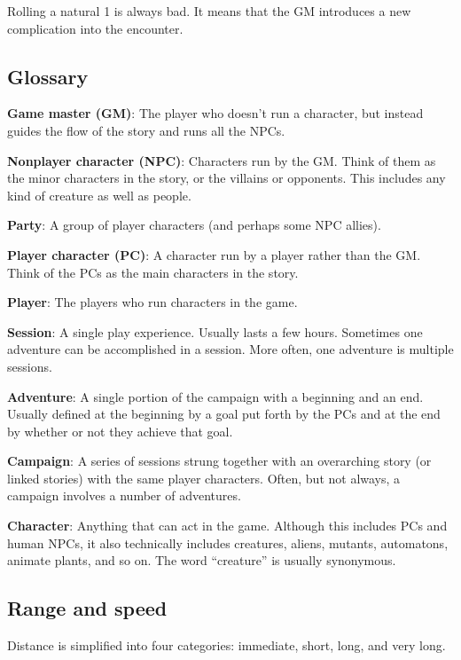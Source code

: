 \begin{multicols}{2}
Rolling a natural 1 is always bad. It means that the GM introduces a new complication into the encounter.

\subsection{Glossary}

\textbf{Game master (GM)}: The player who doesn’t run a character, but instead guides the flow of the story and runs all the NPCs.

\textbf{Nonplayer character (NPC)}: Characters run by the GM. Think of them as the minor characters in the story, or the villains or opponents. This includes any kind of creature as well as people.

\textbf{Party}: A group of player characters (and perhaps some NPC allies).

\textbf{Player character (PC)}: A character run by a player rather than the GM. Think of the PCs as the main characters in the story.

\textbf{Player}: The players who run characters in the game.

\textbf{Session}: A single play experience. Usually lasts a few hours. Sometimes one adventure can be accomplished in a session. More often, one adventure is multiple sessions.

\textbf{Adventure}: A single portion of the campaign with a beginning and an end. Usually defined at the beginning by a goal put forth by the PCs and at the end by whether or not they achieve that goal.

\textbf{Campaign}: A series of sessions strung together with an overarching story (or linked stories) with the same player characters. Often, but not always, a campaign involves a number of adventures.

\textbf{Character}: Anything that can act in the game. Although this includes PCs and human NPCs, it also technically includes creatures, aliens, mutants, automatons, animate plants, and so on. The word “creature” is usually synonymous.

\subsection{Range and speed}

Distance is simplified into four categories: immediate, short, long, and very long.


\end{multicols}
